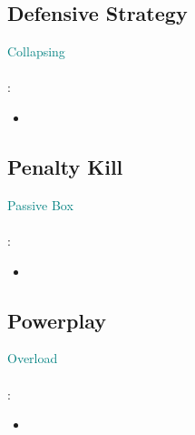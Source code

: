 \documentclass[10pt, french]{article}
\begin{document}
\begin{multicols*}{2}
\subsection*{Defensive Strategy}

\textcolor{teal}{Collapsing}

\paragraph{}: 

\begin{minipage}{0.4\columnwidth}
\begin{itemize}[leftmargin = *]
	\item	
\end{itemize}
\end{minipage}
\begin{minipage}{0.6\columnwidth}

\end{minipage}

\subsection*{Penalty Kill}

\textcolor{teal}{Passive Box}

\paragraph{}: 

\begin{minipage}{0.4\columnwidth}
\begin{itemize}[leftmargin = *]
	\item	
\end{itemize}
\end{minipage}
\begin{minipage}{0.6\columnwidth}

\end{minipage}

\subsection*{Powerplay}

\textcolor{teal}{Overload}

\paragraph{}: 

\begin{minipage}{0.4\columnwidth}
\begin{itemize}[leftmargin = *]
	\item	
\end{itemize}
\end{minipage}
\begin{minipage}{0.6\columnwidth}


\end{minipage}
\end{multicols*}
\end{document}

